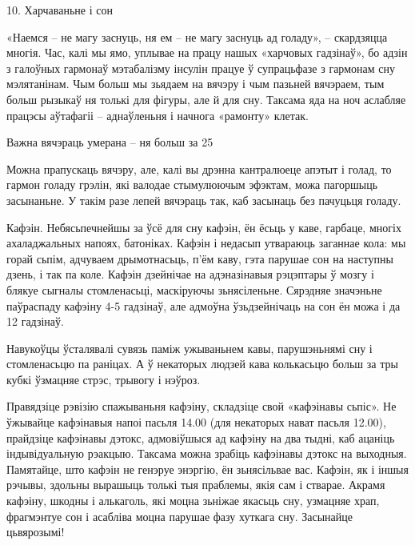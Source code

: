 10. Харчаваньне і сон

«Наемся – не магу заснуць, ня ем – не магу заснуць ад голаду», – скардзяцца многія. Час, калі мы ямо, уплывае на працу нашых «харчовых гадзінаў», бо адзін з галоўных гармонаў мэтабалізму інсулін працуе ў супрацьфазе з гармонам сну мэлятанінам. Чым больш мы зьядаем на вячэру і чым пазьней вячэраем, тым больш рызыкаў ня толькі для фігуры, але й для сну. Таксама яда на ноч аслабляе працэсы аўтафагіі – аднаўленьня і начнога «рамонту» клетак.

Важна вячэраць умерана – ня больш за 25%

Можна прапускаць вячэру, але, калі вы дрэнна кантралюеце апэтыт і голад, то гармон голаду грэлін, які валодае стымулюючым эфэктам, можа пагоршыць засынаньне. У такім разе лепей вячэраць так, каб засынаць без пачуцьця голаду.

Кафэін. Небясьпечнейшы за ўсё для сну кафэін, ён ёсьць у каве, гарбаце, многіх ахаладжальных напоях, батоніках. Кафэін і недасып утвараюць заганнае кола: мы горай сьпім, адчуваем дрымотнасьць, п'ём каву, гэта парушае сон на наступны дзень, і так па коле. Кафэін дзейнічае на адэназінавыя рэцэптары ў мозгу і блякуе сыгналы стомленасьці, маскіруючы зьнясіленьне. Сярэдняе значэньне паўраспаду кафэіну 4-5 гадзінаў, але адмоўна ўзьдзейнічаць на сон ён можа і да 12 гадзінаў.

Навукоўцы ўсталявалі сувязь паміж ужываньнем кавы, парушэньнямі сну і стомленасьцю па раніцах. А ў некаторых людзей кава колькасьцю больш за тры кубкі ўзмацняе стрэс, трывогу і нэўроз.

Правядзіце рэвізію спажываньня кафэіну, складзіце свой «кафэінавы сьпіс». Не ўжывайце кафэінавыя напоі пасьля 14.00 (для некаторых нават пасьля 12.00), прайдзіце кафэінавы дэтокс, адмовіўшыся ад кафэіну на два тыдні, каб ацаніць індывідуальную рэакцыю. Таксама можна зрабіць кафэінавы дэтокс на выходныя. Памятайце, што кафэін не генэруе энэргію, ён зьнясільвае вас. Кафэін, як і іншыя рэчывы, здольны вырашыць толькі тыя праблемы, якія сам і стварае. Акрамя кафэіну, шкодны і алькаголь, які моцна зьніжае якасьць сну, узмацняе храп, фрагмэнтуе сон і асабліва моцна парушае фазу хуткага сну. Засынайце цьвярозымі!

